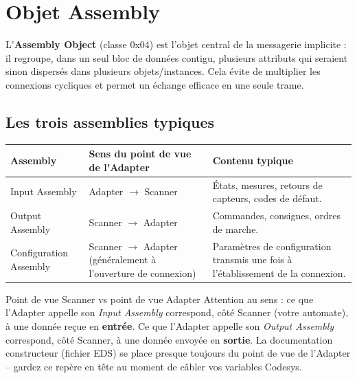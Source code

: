 \section{Objet Assembly}
\label{sec:objets_assembly}

L'\textbf{Assembly Object} (classe 0x04) est l'objet central de la messagerie implicite : il regroupe, dans un seul bloc de données contigu, plusieurs attributs qui seraient sinon dispersés dans plusieurs objets/instances. Cela évite de multiplier les connexions cycliques et permet un échange efficace en une seule trame.

\subsection{Les trois assemblies typiques}

\begin{center}
    \begin{tabular}{|p{2.8cm}|p{5cm}|p{6.5cm}|}
        \hline
        \textbf{Assembly} & \textbf{Sens du point de vue de l'Adapter} & \textbf{Contenu typique} \\
        \hline
        Input Assembly & Adapter $\rightarrow$ Scanner & États, mesures, retours de capteurs, codes de défaut. \\
        \hline
        Output Assembly & Scanner $\rightarrow$ Adapter & Commandes, consignes, ordres de marche. \\
        \hline
        Configuration Assembly & Scanner $\rightarrow$ Adapter (généralement à l'ouverture de connexion) & Paramètres de configuration transmis une fois à l'établissement de la connexion. \\
        \hline
    \end{tabular}
\end{center}

\begin{UPSTIinfor}{Point de vue Scanner vs point de vue Adapter}
    Attention au sens : ce que l'Adapter appelle son \emph{Input Assembly} correspond, côté Scanner (votre automate), à une donnée reçue en \textbf{entrée}. Ce que l'Adapter appelle son \emph{Output Assembly} correspond, côté Scanner, à une donnée envoyée en \textbf{sortie}. La documentation constructeur (fichier EDS) se place presque toujours du point de vue de l'Adapter -- gardez ce repère en tête au moment de câbler vos variables Codesys.
\end{UPSTIinfor}

